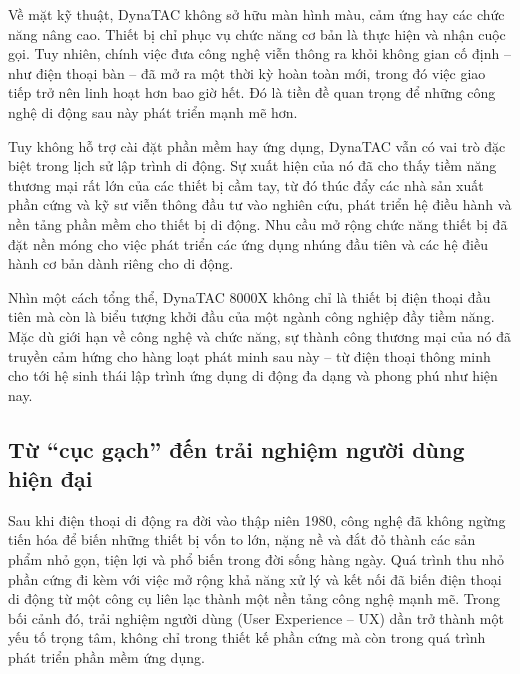   \vspace{0.5em}


  \hspace*{0.8cm}Về mặt kỹ thuật, DynaTAC không sở hữu màn hình màu, cảm ứng hay các chức năng nâng cao. Thiết bị chỉ phục vụ chức năng cơ bản là thực hiện và nhận cuộc gọi. Tuy nhiên, chính việc đưa công nghệ viễn thông ra khỏi không gian cố định – như điện thoại bàn – đã mở ra một thời kỳ hoàn toàn mới, trong đó việc giao tiếp trở nên linh hoạt hơn bao giờ hết. Đó là tiền đề quan trọng để những công nghệ di động sau này phát triển mạnh mẽ hơn.

  \vspace{0.5em}

  \hspace*{0.8cm}Tuy không hỗ trợ cài đặt phần mềm hay ứng dụng, DynaTAC vẫn có vai trò đặc biệt trong lịch sử lập trình di động. Sự xuất hiện của nó đã cho thấy tiềm năng thương mại rất lớn của các thiết bị cầm tay, từ đó thúc đẩy các nhà sản xuất phần cứng và kỹ sư viễn thông đầu tư vào nghiên cứu, phát triển hệ điều hành và nền tảng phần mềm cho thiết bị di động. Nhu cầu mở rộng chức năng thiết bị đã đặt nền móng cho việc phát triển các ứng dụng nhúng đầu tiên và các hệ điều hành cơ bản dành riêng cho di động.

  \vspace{0.5em}

  \hspace*{0.8cm}Nhìn một cách tổng thể, DynaTAC 8000X không chỉ là thiết bị điện thoại đầu tiên mà còn là biểu tượng khởi đầu của một ngành công nghiệp đầy tiềm năng. Mặc dù giới hạn về công nghệ và chức năng, sự thành công thương mại của nó đã truyền cảm hứng cho hàng loạt phát minh sau này – từ điện thoại thông minh cho tới hệ sinh thái lập trình ứng dụng di động đa dạng và phong phú như hiện nay.


\subsection{Từ “cục gạch” đến trải nghiệm người dùng hiện đại}
\renewcommand{\labelitemi}{--}    
    
        \hspace*{0.8cm}Sau khi điện thoại di động ra đời vào thập niên 1980, công nghệ đã không ngừng tiến hóa để biến những thiết bị vốn to lớn, nặng nề và đắt đỏ thành các sản phẩm nhỏ gọn, tiện lợi và phổ biến trong đời sống hàng ngày. Quá trình thu nhỏ phần cứng đi kèm với việc mở rộng khả năng xử lý và kết nối đã biến điện thoại di động từ một công cụ liên lạc thành một nền tảng công nghệ mạnh mẽ. Trong bối cảnh đó, trải nghiệm người dùng (User Experience – UX) dần trở thành một yếu tố trọng tâm, không chỉ trong thiết kế phần cứng mà còn trong quá trình phát triển phần mềm ứng dụng.
    
